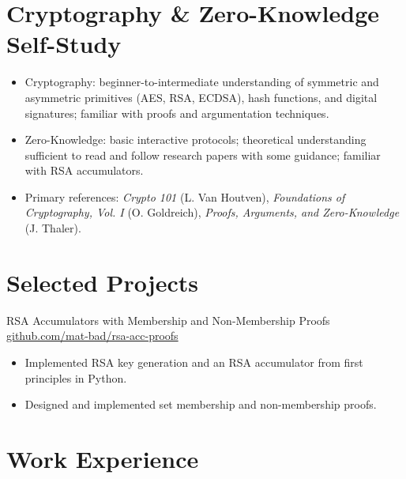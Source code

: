 \documentclass[11pt,a4paper,sans]{moderncv}
\begin{document}
\section{Cryptography \& Zero-Knowledge Self-Study}
\begin{itemize}
  \item Cryptography: beginner-to-intermediate understanding of symmetric and asymmetric primitives (AES, RSA, ECDSA), hash functions, and digital signatures; familiar with proofs and argumentation techniques.
  \item Zero-Knowledge: basic interactive protocols; theoretical understanding sufficient to read and follow research papers with some guidance; familiar with RSA accumulators.
  \item Primary references: \emph{Crypto 101} (L. Van Houtven), \emph{Foundations of Cryptography, Vol. I} (O. Goldreich), \emph{Proofs, Arguments, and Zero-Knowledge} (J. Thaler).
\end{itemize}

\section{Selected Projects}

{RSA Accumulators with Membership and Non-Membership Proofs}
{\href{https://github.com/mat-bad/rsa-acc-proofs}{github.com/mat-bad/rsa-acc-proofs}}
{}
{}
{
\begin{itemize}
  \item Implemented RSA key generation and an RSA accumulator from first principles in Python.
  \item Designed and implemented set membership and non-membership proofs.
\end{itemize}
}

\newpage

\section{Work Experience}
\end{document}
